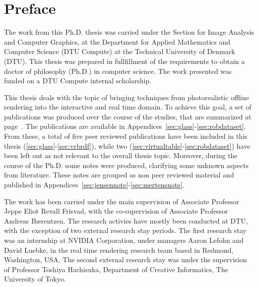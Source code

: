 \chapter{Preface}

The work from this Ph.D. thesis was carried under the Section for Image Analysis and Computer Graphics, at the Department for Applied Mathematics and Computer Science (DTU Compute) at the Technical University of Denmark (DTU). This thesis was prepared in fullfillment of the requirements to obtain a doctor of philosophy (Ph.D.) in computer science. The work presented was funded on a DTU Compute internal scholarship. 

This thesis deals with the topic of bringing techniques from photorealistic offline rendering into the interactive and real time domain. To achieve this goal, a set of publications was produced over the course of the studies, that are summarized at page~\pageref{sec:contributionlist}. The publications are available in Appendices~\ref{sec:glass}-\ref{sec:robdataset}. From these, a total of five peer reviewed publications have been included in this thesis (\ref{sec:glass}-\ref{sec:vrbrdf}), while two (\ref{sec:virtualtable}-\ref{sec:robdataset}) have been left out as not relevant to the overall thesis topic. Moreover, during the course of the Ph.D. some notes were produced, clarifying some unknown aspects from literature. These notes are grouped as non peer reviewed material and published in Appendices~\ref{sec:jensennote}-\ref{sec:mertensnote}. 

The work has been carried under the main supervision of Associate Professor Jeppe Eliot Revall Frisvad, with the co-supervision of Associate Professor Andreas B\ae rentzen. The research activies have mostly been conducted at DTU, with the exception of two external research stay periods. The first research stay was an internship at NVIDIA Corporation, under managers Aaron Lefohn and David Luebke, in the real time rendering research team based in Redmond, Washington, USA. The second external research stay was under the supervision of Professor Toshiya Hachisuka, Department of Creative Informatics, The University of Tokyo.

